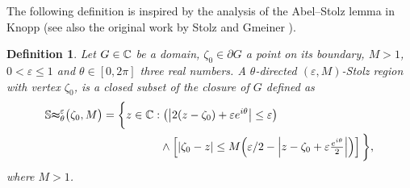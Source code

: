 \documentclass[a4paper,10pt]{article}
\newcommand{\St}{\mathbb{St}}
\newtheorem{defn}{Definition}
\begin{document}
The following definition is inspired by the analysis of the Abel--Stolz lemma in Knopp {\rm\cite[§54, pp.~406--407]{Knopp1951}} (see also the original work by Stolz and Gmeiner \cite[§.15, pp.~287--288]{StolzGmeiner1905}).
\begin{defn}\label{def:locst} Let $G\in\Bbb C$ be a domain, $\zeta_0 \in\partial G$ a point on its boundary, $M>1$, $0< \varepsilon \le 1$ and $\theta\in[0,2\pi]$ three real numbers. A $\theta$-\emph{directed $(\varepsilon,M)$-Stolz region} with vertex $\zeta_0$, is a closed subset of the closure of $G$ defined as
  \begin{equation}\label{eq:appreg}
    \begin{split}
      \St_\theta^\varepsilon\big(\zeta_0,M\big) = \bigg\{ z\in \Bbb C  : &\; {\left(\big| 2(z - \zeta_0) + {\varepsilon}{ e^{i\theta}}\big|\le \varepsilon \right)} \\
      & \land \left[{|\zeta_0-z|}\le M{\left({\varepsilon}/{2} - \left|z - \zeta_0 + {\varepsilon}\tfrac{ e^{i\theta}}{2}\right|\right)}\right]\bigg\},
    \end{split}
  \end{equation}
  where $M>1$.
\end{defn}
\end{document}
